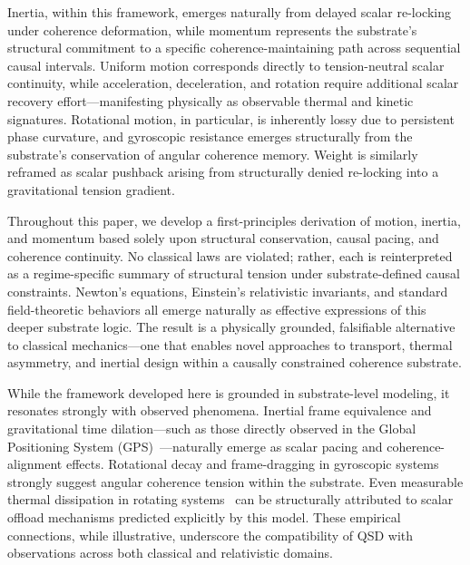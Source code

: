 \documentclass[preprints,article,submit,pdftex,moreauthors]{Definitions/mdpi}
\begin{document}
Inertia, within this framework, emerges naturally from delayed scalar re-locking under coherence deformation, while momentum represents the substrate’s structural commitment to a specific coherence-maintaining path across sequential causal intervals. Uniform motion corresponds directly to tension-neutral scalar continuity, while acceleration, deceleration, and rotation require additional scalar recovery effort—manifesting physically as observable thermal and kinetic signatures. Rotational motion, in particular, is inherently lossy due to persistent phase curvature, and gyroscopic resistance emerges structurally from the substrate’s conservation of angular coherence memory. Weight is similarly reframed as scalar pushback arising from structurally denied re-locking into a gravitational tension gradient.

Throughout this paper, we develop a first-principles derivation of motion, inertia, and momentum based solely upon structural conservation, causal pacing, and coherence continuity. No classical laws are violated; rather, each is reinterpreted as a regime-specific summary of structural tension under substrate-defined causal constraints. Newton’s equations, Einstein’s relativistic invariants, and standard field-theoretic behaviors all emerge naturally as effective expressions of this deeper substrate logic. The result is a physically grounded, falsifiable alternative to classical mechanics—one that enables novel approaches to transport, thermal asymmetry, and inertial design within a causally constrained coherence substrate.

While the framework developed here is grounded in substrate-level modeling, it resonates strongly with observed phenomena. Inertial frame equivalence and gravitational time dilation—such as those directly observed in the Global Positioning System (GPS)~\cite{ashby-gps}—naturally emerge as scalar pacing and coherence-alignment effects. Rotational decay and frame-dragging in gyroscopic systems~\cite{gp-b} strongly suggest angular coherence tension within the substrate. Even measurable thermal dissipation in rotating systems~\cite{rotational-heating} can be structurally attributed to scalar offload mechanisms predicted explicitly by this model. These empirical connections, while illustrative, underscore the compatibility of QSD with observations across both classical and relativistic domains.






\end{document}
